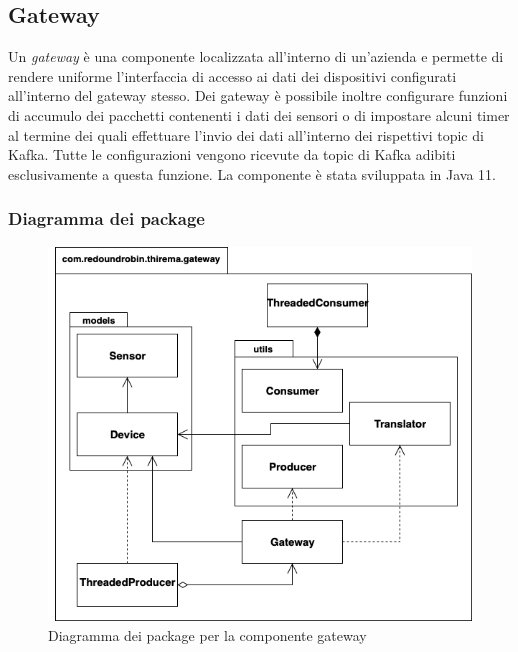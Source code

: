 \subsection{Gateway}
	Un \textit{gateway} è una componente localizzata all'interno di un'azienda e permette di rendere uniforme l'interfaccia di accesso ai dati dei dispositivi configurati all'interno del gateway stesso.
	Dei gateway è possibile inoltre configurare funzioni di accumulo dei pacchetti contenenti i dati dei sensori o di impostare alcuni timer al termine dei quali effettuare l'invio dei dati all'interno dei rispettivi topic di Kafka.
	Tutte le configurazioni vengono ricevute da topic di Kafka adibiti esclusivamente a questa funzione.
	La componente è stata sviluppata in Java 11.
	
	\subsubsection{Diagramma dei package}%
	  	\begin{figure}[H]
			\centering
			\includegraphics[scale=0.550]{res/images/GATEWAY/GatewayPackage.png}
			\caption{Diagramma dei package per la componente gateway}
			\label{Diagramma 1}
		\end{figure}
		\newpage		

